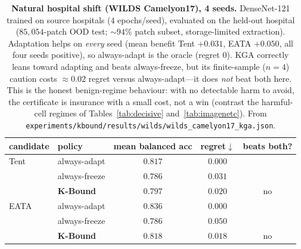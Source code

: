 \documentclass[11pt]{article}
\theoremstyle{plain}
\theoremstyle{definition}
\begin{document}
\begin{table}[h]\centering\small
\begin{tabular}{llccc}
\toprule
candidate & policy & mean balanced acc & regret$\downarrow$ & beats both? \\
\midrule
Tent & always-adapt    & $0.817$ & $\mathbf{0.000}$ & \\
     & always-freeze   & $0.786$ & $0.031$ & \\
     & \textbf{K-Bound} & $0.797$ & $0.020$ & no \\
\midrule
EATA & always-adapt    & $0.836$ & $\mathbf{0.000}$ & \\
     & always-freeze   & $0.786$ & $0.050$ & \\
     & \textbf{K-Bound} & $0.818$ & $0.018$ & no \\
\bottomrule
\end{tabular}
\caption{\textbf{Natural hospital shift (WILDS Camelyon17), 4 seeds.} DenseNet-121 trained on
source hospitals ($4$ epochs/seed), evaluated on the held-out hospital ($85{,}054$-patch OOD
test; $\sim\!94\%$ patch subset, storage-limited extraction). Adaptation helps on \emph{every}
seed (mean benefit Tent $+0.031$, EATA $+0.050$, all four seeds positive), so always-adapt is
the oracle (regret $0$). \textsc{KGA} correctly leans toward adapting and beats always-freeze,
but its finite-sample ($n{=}4$) caution costs $\approx\!0.02$ regret versus always-adapt---it
does \emph{not} beat both here. This is the honest benign-regime behaviour: with no detectable
harm to avoid, the certificate is insurance with a small cost, not a win (contrast the
harmful-cell regimes of Tables~\ref{tab:decisive} and~\ref{tab:imagenetc}). From
\texttt{experiments/kbound/results/wilds/wilds\_camelyon17\_kga.json}.}
\label{tab:camelyon}
\end{table}
\end{document}
